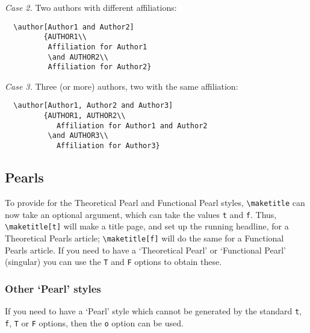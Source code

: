 \documentclass{jfp1}
\begin{document}
\textit{Case 2.} Two authors with different affiliations:
%
\begin{verbatim}
  \author[Author1 and Author2]
         {AUTHOR1\\
          Affiliation for Author1
          \and AUTHOR2\\
          Affiliation for Author2}
\end{verbatim}

\textit{Case 3.} Three (or more) authors, two with the same affiliation:
%
\begin{verbatim}
  \author[Author1, Author2 and Author3]
         {AUTHOR1, AUTHOR2\\
            Affiliation for Author1 and Author2
          \and AUTHOR3\\
            Affiliation for Author3}
\end{verbatim}

\subsection{Pearls}

To provide for the Theoretical Pearl and Functional Pearl styles,
\verb"\maketitle" can now take an optional argument, which can take the
values \verb"t" and \verb"f". Thus, \verb"\maketitle[t]" will make a
title page, and set up the running headline, for a \linebreak Theoretical
Pearls article; \verb"\maketitle[f]" will do the same for a Functional Pearls
article.
If you need to have a `Theoretical Pearl' or `Functional Pearl' (singular)
you can use the \verb"T" and \verb"F" options to obtain these.

\subsubsection{Other `Pearl' styles}

If you need to have a `Pearl' style which cannot be generated by the
standard \verb"t", \verb"f", \verb"T" or \verb"F" options, then the \verb"o"
option can be used.
\end{document}
